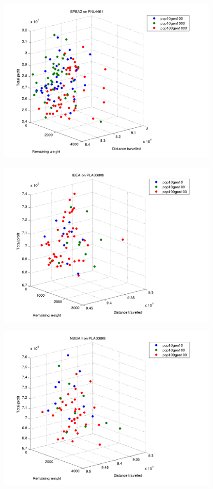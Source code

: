 \documentclass[a4paper,12pt]{article}
\begin{document}
\begin{figure}[h]
  \centering
  \includegraphics[width=.8\linewidth]{q5graphs/fnl4461_spea.png}
  \label{fig:a280279010}
\end{figure}

\begin{figure}[h]
  \centering
  \includegraphics[width=.8\linewidth]{q5graphs/pla33809_ibea.png}
  \label{fig:a280279010}
\end{figure}

\begin{figure}[h]
  \centering
  \includegraphics[width=.8\linewidth]{q5graphs/pla33809_nsga.png}
  \label{fig:a280279010}
\end{figure}
\end{document}
